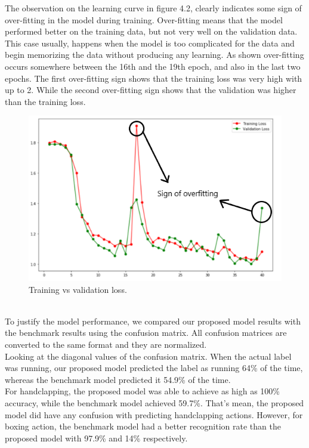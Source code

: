 The observation on the learning curve in figure 4.2, clearly indicates some sign of over-fitting in the model during training. Over-fitting means that the model performed better on the training data, but not very well on the validation data. This case usually, happens when the model is too complicated for the data and begin memorizing the data without producing any learning. As shown over-fitting occurs somewhere between the 16th and the 19th epoch, and also in the last two epochs. The first over-fitting sign shows that the training loss was very high with up to 2. While the second over-fitting sign shows that the validation was higher than the training loss.
\newpage
\begin{figure}[ht]
    \centering
    \includegraphics{Figures/ml}
    \decoRule
    \caption [Training vs validation loss.]{Training vs validation loss.}
    \label{fig:la}
    \end{figure}\hfill \\
    
    To justify the model performance, we compared our proposed model results with the benchmark results using the confusion matrix. All confusion matrices are converted to the same format and they are normalized.\\
    
    Looking at the diagonal values of the confusion matrix. When the actual label was running, our proposed model predicted the label as running 64\% of the time, whereas the benchmark model predicted it 54.9\% of the time.\\
    
    For handclapping, the proposed model was able to achieve as high as 100\% accuracy, while the benchmark model achieved 59.7\%. That's mean, the proposed model did have any confusion with predicting handclapping actions. However, for boxing action, the benchmark model had a better recognition rate than the proposed model with 97.9\% and 14\% respectively.\\
    
